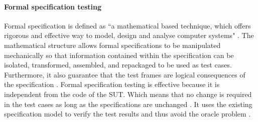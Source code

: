 \paragraph{Formal specification testing}
Formal specification is defined as ``a mathematical based technique, which offers rigorous and effective way to model, design and analyse computer systems" \cite{formal1997specification, Hierons2009}. The mathematical structure allows formal specifications to be manipulated mechanically so that information contained within the specification can be isolated, transformed, assembled, and repackaged to be used as test cases. Furthermore, it also guarantee that the test frames are logical consequences of the specification \cite{donat1997automating}. Formal specification testing is effective because it is independent from the code of the SUT. Which means that no change is required in the test cases as long as the specifications are unchanged \cite{gaudel2010software}. It uses the existing specification model to verify the test results and thus avoid the oracle problem \cite{bertolino2007software}.








